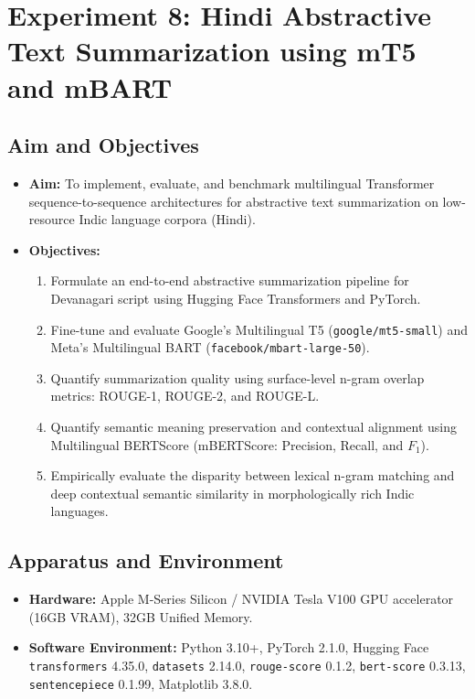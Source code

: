 \documentclass[12pt,a4paper]{report}
\begin{document}
\chapter{Experiment 8: Hindi Abstractive Text Summarization using mT5 and mBART}

\section{Aim and Objectives}
\begin{itemize}
    \item \textbf{Aim:} To implement, evaluate, and benchmark multilingual Transformer sequence-to-sequence architectures for abstractive text summarization on low-resource Indic language corpora (Hindi).
    \item \textbf{Objectives:}
    \begin{enumerate}
        \item Formulate an end-to-end abstractive summarization pipeline for Devanagari script using Hugging Face Transformers and PyTorch.
        \item Fine-tune and evaluate Google's Multilingual T5 (\texttt{google/mt5-small}) and Meta's Multilingual BART (\texttt{facebook/mbart-large-50}).
        \item Quantify summarization quality using surface-level n-gram overlap metrics: ROUGE-1, ROUGE-2, and ROUGE-L.
        \item Quantify semantic meaning preservation and contextual alignment using Multilingual BERTScore (mBERTScore: Precision, Recall, and $F_1$).
        \item Empirically evaluate the disparity between lexical n-gram matching and deep contextual semantic similarity in morphologically rich Indic languages.
    \end{enumerate}
\end{itemize}

\section{Apparatus and Environment}
\begin{itemize}
    \item \textbf{Hardware:} Apple M-Series Silicon / NVIDIA Tesla V100 GPU accelerator (16GB VRAM), 32GB Unified Memory.
    \item \textbf{Software Environment:} Python 3.10+, PyTorch 2.1.0, Hugging Face \texttt{transformers} 4.35.0, \texttt{datasets} 2.14.0, \texttt{rouge-score} 0.1.2, \texttt{bert-score} 0.3.13, \texttt{sentencepiece} 0.1.99, Matplotlib 3.8.0.
\end{itemize}
\end{document}
